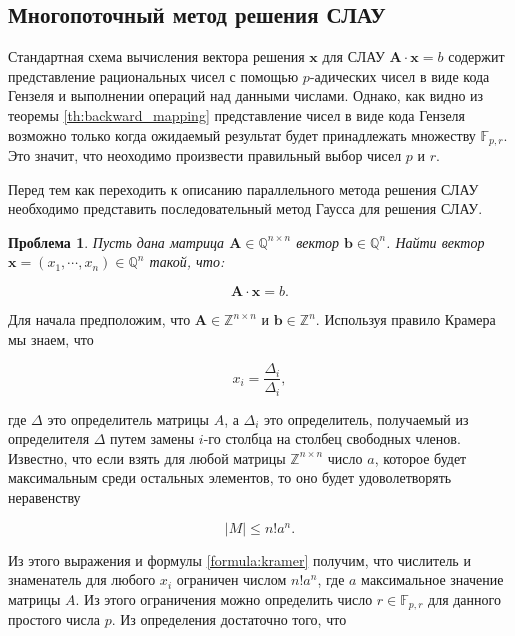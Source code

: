 \documentclass[master, och, diploma, times]{sty/SCWorks}
\theoremstyle{plain}
\newtheorem{problem}{Проблема}[section]
\theoremstyle{definition}
\numberwithin{equation}{section}
\begin{document}
\subsection{Многопоточный метод решения СЛАУ}
Стандартная схема вычисления вектора решения $\boldsymbol{x}$ для СЛАУ $\boldsymbol{A}\cdot \boldsymbol{x} = b$ содержит представление рациональных чисел с помощью $p$-адических чисел в виде кода Гензеля и выполнении операций над данными числами. Однако, как видно из теоремы \ref{th:backward_mapping} представление чисел в виде кода Гензеля возможно только когда ожидаемый результат будет принадлежать множеству $\mathbb{F}_{p,r}$. Это значит, что неоходимо  произвести правильный выбор чисел $p$ и $r$.


Перед тем как переходить к описанию параллельного метода решения СЛАУ необходимо представить последовательный метод Гаусса для решения СЛАУ.

\begin{problem}
Пусть дана матрица $\boldsymbol{A} \in \mathbb{Q}^{n \times n}$ вектор $\boldsymbol{b} \in \mathbb{Q}^{n}$. Найти вектор $\boldsymbol{x}=(x_1,\cdots,x_n) \in \mathbb{Q}^{n}$ такой, что:

\begin{equation}
\boldsymbol{A}\cdot \boldsymbol{x} = b.
\end{equation}

\end{problem}

Для начала предположим, что $\boldsymbol{A} \in \mathbb{Z}^{n \times n}$ и $\boldsymbol{b} \in \mathbb{Z}^{n}$. Используя правило Крамера мы знаем, что 

\begin{equation}\label{formula:kramer}
x_i=\frac{\Delta_i}{\Delta_i},	
\end{equation}

\noindent где $\Delta$ это определитель матрицы $A$, а $\Delta_i$ это определитель, получаемый из определителя $\Delta$ путем замены $i$-го столбца на столбец свободных членов. Известно, что если взять для любой матрицы $\mathbb{Z}^{n \times n}$ число $a$, которое будет максимальным среди остальных элементов, то оно будет удоволетворять неравенству

\begin{equation}
\mid M \mid \leq n!a^n.
\end{equation}

\noindent Из этого выражения и формулы \ref{formula:kramer} получим, что числитель и знаменатель для любого $x_i$ ограничен числом $n!a^n$, где $a$ максимальное значение матрицы $A$. Из этого ограничения можно определить число $r \in \mathbb{F}_{p,r}$ для данного простого числа $p$. Из определения достаточно того, что
\end{document}
